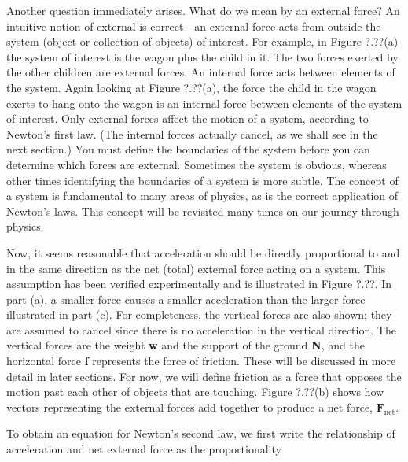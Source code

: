 \documentclass[../../main-ap-physics.tex]{subfiles}
\begin{document}
\vspace{1em}

Another question immediately arises. What do we mean by an external force? An intuitive notion of external is correct---an \gls{external force} acts from outside the \gls{system} (object or collection of objects) of interest. For example, in Figure ?.??(a) the system of interest is the wagon plus the child in it. The two forces exerted by the other children are external forces. An internal force acts between elements of the system. Again looking at Figure ?.??(a), the force the child in the wagon exerts to hang onto the wagon is an internal force between elements of the system of interest. Only external forces affect the motion of a system, according to Newton's first law. (The internal forces actually cancel, as we shall see in the next section.) You must define the boundaries of the system before you can determine which forces are external. Sometimes the system is obvious, whereas other times identifying the boundaries of a system is more subtle. The concept of a system is fundamental to many areas of physics, as is the correct application of Newton's laws. This concept will be revisited many times on our journey through physics.

\vspace{1em} %

Now, it seems reasonable that acceleration should be directly proportional to and in the same direction as the net (total) external force acting on a system. This assumption has been verified experimentally and is illustrated in Figure ?.??. In part (a), a smaller force causes a smaller acceleration than the larger force illustrated in part (c). For completeness, the vertical forces are also shown; they are assumed to cancel since there is no acceleration in the vertical direction. The vertical forces are the weight \textbf{w} and the support of the ground \textbf{N}, and the horizontal force \textbf{f} represents the force of friction. These will be discussed in more detail in later sections. For now, we will define \gls{friction} as a force that opposes the motion past each other of objects that are touching. Figure ?.??(b) shows how vectors representing the external forces add together to produce a net force,  $\textbf{F}_{\text{net}}$.

\vspace{1em}

To obtain an equation for Newton's second law, we first write the relationship of acceleration and net external force as the proportionality
\end{document}
